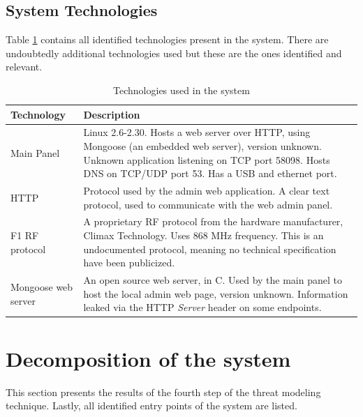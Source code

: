 \subsection{System Technologies}
Table \ref{tb:system-technologies} contains all identified technologies present in the system. There are undoubtedly additional technologies used but these are the ones identified and relevant.
\begin{table}[!ht]
    \centering
    \begin{tabularx}{\textwidth}{l X}
        \hline
        \textbf{Technology}  & \textbf{Description}
        \\ \hline
        Main Panel & Linux 2.6-2.30. Hosts a web server over HTTP, using Mongoose (an embedded web server), version unknown. Unknown application listening on TCP port 58098. Hosts DNS on TCP/UDP port 53. Has a USB and ethernet port.
        \\ \hline
        HTTP  & Protocol used by the admin web application. A clear text protocol, used to communicate with the web admin panel.
        \\ \hline
        F1 RF protocol  & A proprietary \gls{RF} protocol from the hardware manufacturer, Climax Technology. Uses 868 MHz frequency. This is an undocumented protocol, meaning no technical specification have been publicized.
        \\ \hline
        Mongoose web server  & An open source web server, in C. Used by the main panel to host the local admin web page, version unknown. Information leaked via the HTTP \textit{Server} header on some endpoints.
        \\ \hline
    \end{tabularx}
    \caption{Technologies used in the system}
    \label{tb:system-technologies}
\end{table}

\section{Decomposition of the system}
This section presents the results of the fourth step of the threat modeling technique. Lastly, all identified entry points of the system are listed.

